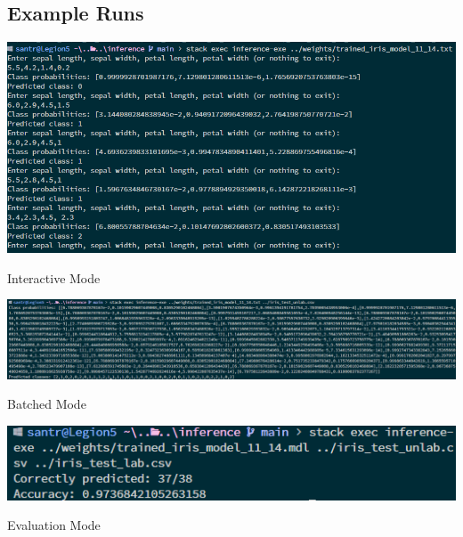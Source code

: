 \documentclass[12pt, titlepage]{article}
\begin{document}
\subsection{Example Runs}
{
	\begin{center}
		\includegraphics[width=\textwidth]{../images/examples.png}
	\end{center}
	\begin{center}
		Interactive Mode
	\end{center}
	\begin{center}
		\includegraphics[width=\textwidth]{../images/examplebatch.png}
	\end{center}
	\begin{center}
		Batched Mode
	\end{center}
	\begin{center}
		\includegraphics[width=\textwidth]{../images/exampleeval.png}
	\end{center}
	\begin{center}
		Evaluation Mode
	\end{center}
}
\end{document}
